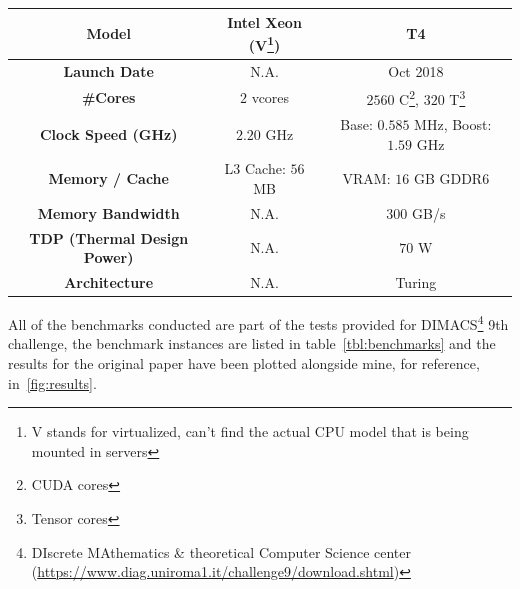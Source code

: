 \documentclass[a4paper,10pt]{article}
\begin{document}
\begin{center}
\begin{longtable}{|c|c|c|}
		\textbf{Model}                      & Intel Xeon (V\footnote{V stands for virtualized, can't find the actual CPU model that is being mounted in servers}) & T4                                                                  \\\hline
		\textbf{Launch Date}                & N.A.                                                                                                                & Oct 2018                                                            \\\hline
		\textbf{\#Cores}                    & $2$ vcores                                                                                                          & $\num{2560}$ C\footnote{CUDA cores}, $320$ T\footnote{Tensor cores} \\\hline
		\textbf{Clock Speed (GHz)}          & $\num{2.20}$ GHz                                                                                                    & Base: $0.585$ MHz, Boost: $1.59$ GHz                                \\\hline
		\textbf{Memory / Cache}             & L3 Cache: $56$ MB                                                                                                   & VRAM: $16$ GB GDDR6                                                 \\\hline
		\textbf{Memory Bandwidth}           & N.A.                                                                                                                & 300 GB/s                                                            \\\hline
		\textbf{TDP (Thermal Design Power)} & N.A.                                                                                                                & $70$ W                                                              \\\hline
		\textbf{Architecture}               & N.A.                                                                                                                & Turing
	\end{longtable}
\end{center}
All of the benchmarks conducted are part of the tests provided for DIMACS\footnote{DIscrete
MAthematics \& theoretical Computer Science center
(\url{https://www.diag.uniroma1.it/challenge9/download.shtml})} 9th challenge, the benchmark
instances are listed in table~\ref{tbl:benchmarks} and the results for the original paper have been
plotted alongside mine, for reference, in~\ref{fig:results}.
\end{document}
